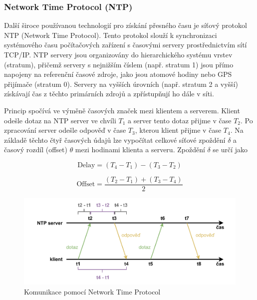 \subsubsection{Network Time Protocol (NTP)}
Další široce používanou technologií pro získání přesného času je síťový protokol NTP (Network Time Protocol). Tento protokol slouží k synchronizaci systémového času počítačových zařízení s časovými servery prostřednictvím sítí TCP/IP. NTP servery jsou organizovány do hierarchického systému vrstev (stratum), přičemž servery s nejnižším číslem (např. stratum 1) jsou přímo napojeny na referenční časové zdroje, jako jsou atomové hodiny nebo GPS přijímače (stratum 0). Servery na vyšších úrovních (např. stratum 2 a vyšší) získávají čas z těchto primárních zdrojů a zpřístupňují ho dále v síti.

Princip spočívá ve výměně časových značek mezi klientem a serverem. Klient odešle dotaz na NTP server ve chvíli $T_1$ a server tento dotaz přijme v čase $T_2$. Po zpracování server odešle odpověď v čase $T_3$, kterou klient přijme v čase $T_4$. Na základě těchto čtyř časových údajů lze vypočítat celkové síťové zpoždění $\delta$ a časový rozdíl (offset) $\theta$ mezi hodinami klienta a serveru. Zpoždění $\delta$ se určí jako 

\begin{equation}
    \text{Delay} = (T_4 - T_1) - (T_3 - T_2)
    \label{eq:ntp_delay}
\end{equation}

\begin{equation}
    \text{Offset} = \frac{(T_2 - T_1) + (T_3 - T_4)}{2}
    \label{eq:ntp_offset}
\end{equation}

\begin{figure}[h]
    \centering
    \includegraphics[width=1.00\textwidth]{obrazky-figures/network_time_protocol.pdf}
    
    \caption{Komunikace pomocí Network Time Protocol \cite{time_theory_gps}}
    \label{fig:low-power-modes}
\end{figure}

